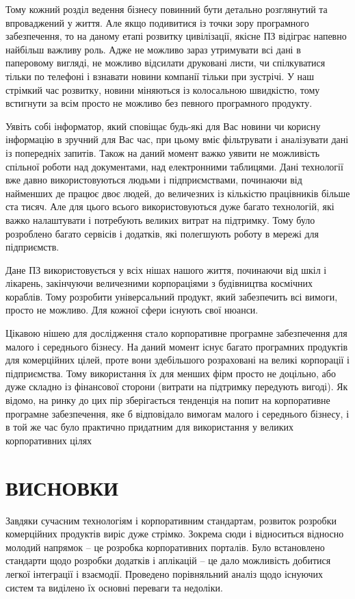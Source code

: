 Тому кожний розділ ведення бізнесу повинний бути детально розглянутий та впроваджений у життя. 
Але якщо подивитися із точки зору програмного забезпечення, то на даному етапі розвитку цивілізації, якісне ПЗ відіграє напевно найбільш важливу роль. 
Адже не можливо зараз утримувати всі дані в паперовому вигляді, не можливо відсилати друковані листи, чи спілкуватися тільки по телефоні і взнавати новини компанії тільки при зустрічі. 
У наш стрімкий час розвитку, новини міняються із колосальною швидкістю, тому встигнути за всім просто не можливо без певного програмного продукту. 
\par Уявіть собі інформатор, який сповіщає будь-які для Вас новини чи корисну інформацію в зручний для Вас час, при цьому вміє фільтрувати і аналізувати дані із попередніх запитів. 
Також на даний момент важко уявити не можливість спільної роботи над документами, над електронними таблицями. 
Дані технології вже давно використовуються людьми і підприємствами, починаючи від найменших де працює двоє людей, до величезних із кількістю працівників більше ста тисяч. 
Але для цього всього використовуються дуже багато технологій, які важко налаштувати і потребують великих витрат на підтримку.
Тому було розроблено багато сервісів і додатків, які полегшують роботу в мережі для підприємств.
\par Дане ПЗ використовується у всіх нішах нашого життя, починаючи від шкіл і лікарень, закінчуючи величезними корпораціями з будівництва космічних кораблів. 
Тому розробити універсальний продукт, який забезпечить всі вимоги, просто не можливо. 
Для кожної сфери існують свої нюанси.
\par Цікавою нішею для дослідження стало корпоративне програмне забезпечення для малого і середнього бізнесу.
 На даний момент існує багато програмних продуктів для комерційних цілей, проте вони здебільшого розраховані на великі корпорації і підприємства.
Тому використання їх для менших фірм просто не доцільно, або дуже складно із фінансової сторони (витрати на підтримку передують вигоді).
Як відомо, на ринку до цих пір зберігається тенденція на попит на корпоративне програмне забезпечення, яке б відповідало вимогам малого і середнього бізнесу, і в той же час було практично придатним для використання у великих корпоративних цілях









\section*{ВИСНОВКИ}
Завдяки сучасним технологіям і корпоративним стандартам, розвиток розробки комерційних продуктів виріс дуже стрімко. 
Зокрема сюди і відноситься відносно молодий напрямок -- це розробка корпоративних порталів. 
Було встановлено стандарти щодо розробки додатків і аплікацій -- це дало можливість добитися легкої інтеграції і взаємодії. 
Проведено порівняльний аналіз щодо існуючих систем та виділено їх основні переваги та недоліки.

